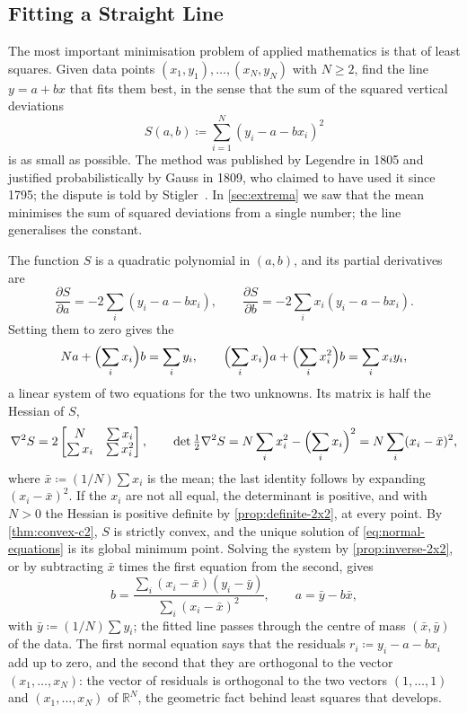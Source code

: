 \subsection{Fitting a Straight Line}

The most important minimisation problem of applied mathematics is that of least squares. Given data points $(x_1,y_1),\ldots,(x_N,y_N)$ with $N\ge2$, find the line $y=a+bx$ that fits them best, in the sense that the sum of the squared vertical deviations
\[
S(a,b)\coloneqq\sum_{i=1}^N(y_i-a-bx_i)^2
\]
is as small as possible. The method was published by Legendre in 1805 and justified probabilistically by Gauss in 1809, who claimed to have used it since 1795; the dispute is told by Stigler~\cite{legendre1805,gauss1809,stigler1981}. In \cref{sec:extrema} we saw that the mean minimises the sum of squared deviations from a single number; the line generalises the constant.

The function $S$ is a quadratic polynomial in $(a,b)$, and its partial derivatives are
\[
\frac{\partial S}{\partial a}=-2\sum_i(y_i-a-bx_i),\qquad\frac{\partial S}{\partial b}=-2\sum_ix_i(y_i-a-bx_i).
\]
Setting them to zero gives the 
\begin{equation}
Na+\Bigl(\sum_ix_i\Bigr)b=\sum_iy_i,\qquad\Bigl(\sum_ix_i\Bigr)a+\Bigl(\sum_ix_i^2\Bigr)b=\sum_ix_iy_i ,
\label{eq:normal-equations}
\end{equation}
a linear system of two equations for the two unknowns. Its matrix is half the Hessian of $S$,
\[
\nabla^2S=2\begin{bmatrix}N&\sum x_i\\\sum x_i&\sum x_i^2\end{bmatrix},\qquad\det\tfrac12\nabla^2S=N\sum_ix_i^2-\Bigl(\sum_ix_i\Bigr)^2=N\sum_i(x_i-\bar x)^2 ,
\]
where $\bar x\coloneqq(1/N)\sum x_i$ is the mean; the last identity follows by expanding $(x_i-\bar x)^2$. If the $x_i$ are not all equal, the determinant is positive, and with $N>0$ the Hessian is positive definite by \cref{prop:definite-2x2}, at every point. By \cref{thm:convex-c2}, $S$ is strictly convex, and the unique solution of \eqref{eq:normal-equations} is its global minimum point. Solving the system by \cref{prop:inverse-2x2}, or by subtracting $\bar x$ times the first equation from the second, gives
\[
b=\frac{\sum_i(x_i-\bar x)(y_i-\bar y)}{\sum_i(x_i-\bar x)^2},\qquad a=\bar y-b\bar x ,
\]
with $\bar y\coloneqq(1/N)\sum y_i$; the fitted line passes through the centre of mass $(\bar x,\bar y)$ of the data. The first normal equation says that the residuals $r_i\coloneqq y_i-a-bx_i$ add up to zero, and the second that they are orthogonal to the vector $(x_1,\ldots,x_N)$: the vector of residuals is orthogonal to the two vectors $(1,\ldots,1)$ and $(x_1,\ldots,x_N)$ of $\mathbb R^N$, the geometric fact behind least squares that  develops.

